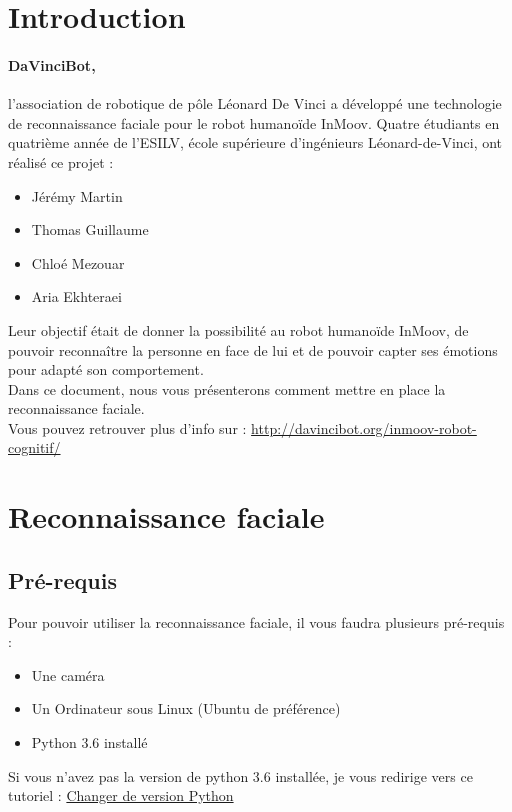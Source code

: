 \documentclass[12pt, oneside]{article}
\begin{document}
\tableofcontents
\newpage

\section{Introduction}

\paragraph{DaVinciBot,} l'association de robotique de pôle Léonard De Vinci a développé une technologie de reconnaissance faciale pour le robot humanoïde InMoov.
Quatre étudiants en quatrième année de l'ESILV, école supérieure d'ingénieurs Léonard-de-Vinci, ont réalisé ce projet : 
\begin{itemize}
	\item Jérémy Martin
	\item Thomas Guillaume
	\item Chloé Mezouar 
	\item Aria Ekhteraei 
\end{itemize}
Leur objectif était de donner la possibilité au robot humanoïde InMoov, de pouvoir reconnaître la personne en face de lui et de pouvoir capter ses émotions pour adapté son comportement.\\
Dans ce document, nous vous présenterons comment mettre en place la reconnaissance faciale. \\
Vous pouvez retrouver plus d'info sur : \url{http://davincibot.org/inmoov-robot-cognitif/}

\section{Reconnaissance faciale}
\subsection{Pré-requis}

Pour pouvoir utiliser la reconnaissance faciale, il vous faudra plusieurs pré-requis :
\begin{itemize}
	\item Une caméra
	\item Un Ordinateur sous Linux (Ubuntu de préférence)
	\item Python 3.6 installé
\end{itemize}

Si vous n'avez pas la version de python 3.6 installée, je vous redirige vers ce tutoriel : 
\href{https://mk57blog.wordpress.com/2017/01/28/comment-modifier-la-version-par-defaut-de-python-sur-debian/}{Changer de version Python}
\end{document}
